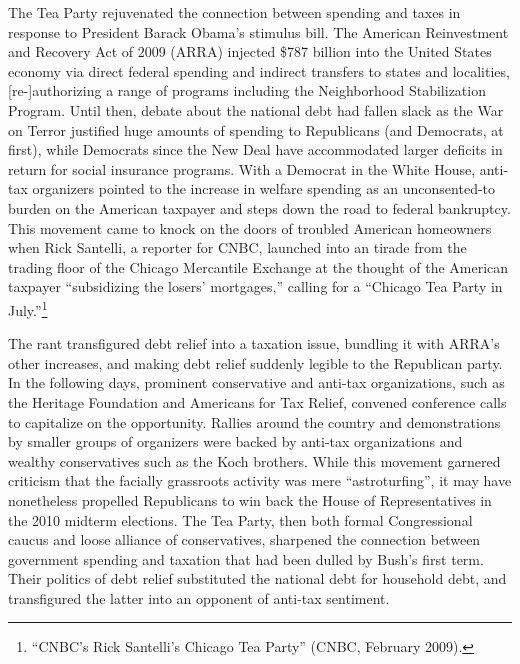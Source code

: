 \documentclass[12pt,oneside]{psthesis}
\begin{document}
The Tea Party rejuvenated the connection between spending and taxes in response to President Barack Obama's stimulus bill.
The American Reinvestment and Recovery Act of 2009 (ARRA) injected \$787 billion into the United States economy via direct federal spending and indirect transfers to states and localities, {[}re-{]}authorizing a range of programs including the Neighborhood Stabilization Program.
Until then, debate about the national debt had fallen slack as the War on Terror justified huge amounts of spending to Republicans (and Democrats, at first), while Democrats since the New Deal have accommodated larger deficits in return for social insurance programs.
With a Democrat in the White House, anti-tax organizers pointed to the increase in welfare spending as an unconsented-to burden on the American taxpayer and steps down the road to federal bankruptcy.
This movement came to knock on the doors of troubled American homeowners when Rick Santelli, a reporter for CNBC, launched into an tirade from the trading floor of the Chicago Mercantile Exchange at the thought of the American taxpayer ``subsidizing the losers' mortgages,'' calling for a ``Chicago Tea Party in July.''\footnote{``CNBC's Rick Santelli's Chicago Tea Party'' (CNBC, February 2009).}

The rant transfigured debt relief into a taxation issue, bundling it with ARRA's other increases, and making debt relief suddenly legible to the Republican party.
In the following days, prominent conservative and anti-tax organizations, such as the Heritage Foundation and Americans for Tax Relief, convened conference calls to capitalize on the opportunity.
Rallies around the country and demonstrations by smaller groups of organizers were backed by anti-tax organizations and wealthy conservatives such as the Koch brothers.
While this movement garnered criticism that the facially grassroots activity was mere ``astroturfing'', it may have nonetheless propelled Republicans to win back the House of Representatives in the 2010 midterm elections.
The Tea Party, then both formal Congressional caucus and loose alliance of conservatives, sharpened the connection between government spending and taxation that had been dulled by Bush's first term.
Their politics of debt relief substituted the national debt for household debt, and transfigured the latter into an opponent of anti-tax sentiment.
\end{document}
